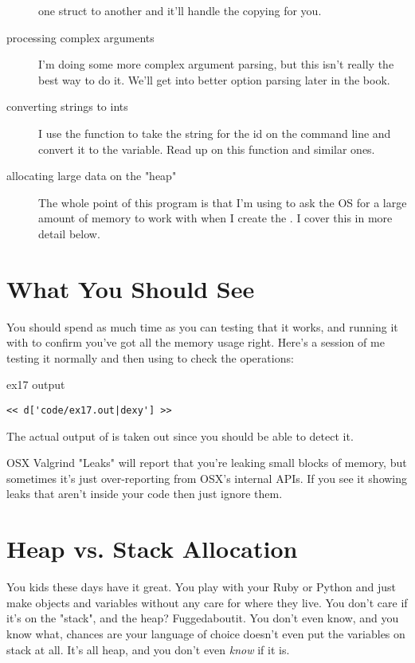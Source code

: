 \begin{description}
    one struct to another and it'll handle the copying for you.
\item [processing complex arguments] I'm doing some more complex argument parsing,
    but this isn't really the best way to do it.  We'll get into better option
    parsing later in the book.
\item [converting strings to ints] I use the  function to take the
    string for the id on the command line and convert it to the 
    variable.  Read up on this function and similar ones.
\item [allocating large data on the "heap"] The whole point of this program is
    that I'm using  to ask the OS for a large amount of memory
    to work with when I create the .  I cover this in more
    detail below.
\end{description}


\section{What You Should See}

You should spend as much time as you can testing that it works, and running
it with  to confirm you've got all the memory usage
right.  Here's a session of me testing it normally and then using
 to check the operations:

\begin{code}{ex17 output}
\begin{lstlisting}
<< d['code/ex17.out|dexy'] >>
\end{lstlisting}
\end{code}

The actual output of  is taken out since you should
be able to detect it.

\begin{aside}{OSX Valgrind "Leaks"}
 will report that you're leaking small blocks of memory,
but sometimes it's just over-reporting from OSX's internal APIs.  If you see it
showing leaks that aren't inside your code then just ignore them.
\end{aside}

\section{Heap vs. Stack Allocation}

You kids these days have it great.  You play with your Ruby or Python and 
just make objects and variables without any care for where they live.  You
don't care if it's on the "stack", and the heap?  Fuggedaboutit.  You don't
even know, and you know what, chances are your language of choice doesn't
even put the variables on stack at all.  It's all heap, and you don't even
\emph{know} if it is.

